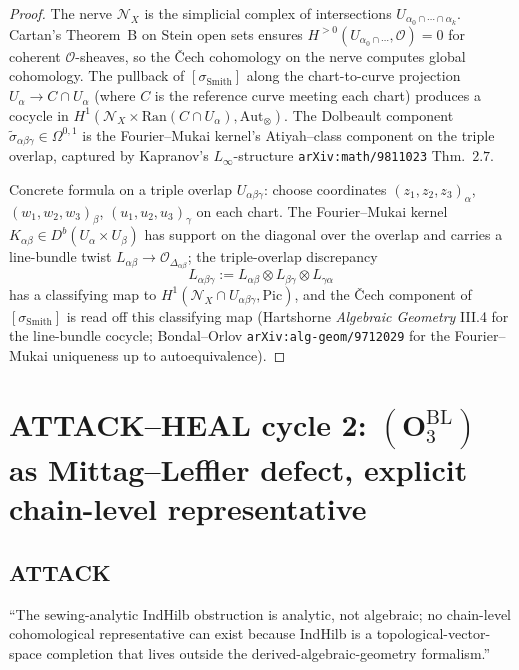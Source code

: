 \documentclass[11pt]{amsart}
\newcommand{\cO}{\mathcal{O}}
\newcommand{\cN}{\mathcal{N}}
\newcommand{\Ran}{\mathrm{Ran}}
\newcommand{\Aut}{\mathrm{Aut}}
\begin{document}
\begin{proof}
The nerve $\cN_X$ is the simplicial complex of intersections
$U_{\alpha_0 \cap \cdots \cap \alpha_k}$. Cartan's Theorem~B on
Stein open sets ensures $H^{>0}(U_{\alpha_0 \cap \cdots}, \cO) = 0$
for coherent $\cO$-sheaves, so the \v{C}ech cohomology on the nerve
computes global cohomology. The pullback of
$[\sigma_{\mathrm{Smith}}]$ along the chart-to-curve projection
$U_\alpha \to C \cap U_\alpha$ (where $C$ is the reference curve
meeting each chart) produces a cocycle in $H^1(\cN_X \times
\Ran(C \cap U_\alpha), \Aut_\otimes)$. The Dolbeault component
$\tilde\sigma_{\alpha\beta\gamma} \in \Omega^{0,1}$ is the
Fourier--Mukai kernel's Atiyah--class component on the triple
overlap, captured by Kapranov's $L_\infty$-structure
\texttt{arXiv:math/9811023} Thm.~$2.7$.

Concrete formula on a triple overlap $U_{\alpha\beta\gamma}$: choose
coordinates $(z_1, z_2, z_3)_\alpha$, $(w_1, w_2, w_3)_\beta$,
$(u_1, u_2, u_3)_\gamma$ on each chart. The Fourier--Mukai kernel
$K_{\alpha\beta} \in D^b(U_\alpha \times U_\beta)$ has support on
the diagonal over the overlap and carries a line-bundle twist
$L_{\alpha\beta} \to \cO_{\Delta_{\alpha\beta}}$; the triple-overlap
discrepancy
\[
L_{\alpha\beta\gamma} := L_{\alpha\beta} \otimes L_{\beta\gamma}
\otimes L_{\gamma\alpha}
\]
has a classifying map to $H^1(\cN_X \cap U_{\alpha\beta\gamma},
\mathrm{Pic})$, and the \v{C}ech component of
$[\sigma_{\mathrm{Smith}}]$ is read off this classifying map
(Hartshorne \emph{Algebraic Geometry} III.4 for the line-bundle
cocycle; Bondal--Orlov \texttt{arXiv:alg-geom/9712029} for the
Fourier--Mukai uniqueness up to autoequivalence).
\end{proof}

\section{ATTACK--HEAL cycle 2: $(\mathbf{O}_3^{\mathrm{BL}})$ as
Mittag--Leffler defect, explicit chain-level representative}
\label{sec:cycle-2-O3-mittag-leffler}

\subsection*{ATTACK}

``The sewing-analytic IndHilb obstruction is analytic, not algebraic;
no chain-level cohomological representative can exist because
IndHilb is a topological-vector-space completion that lives outside
the derived-algebraic-geometry formalism.''
\end{document}
